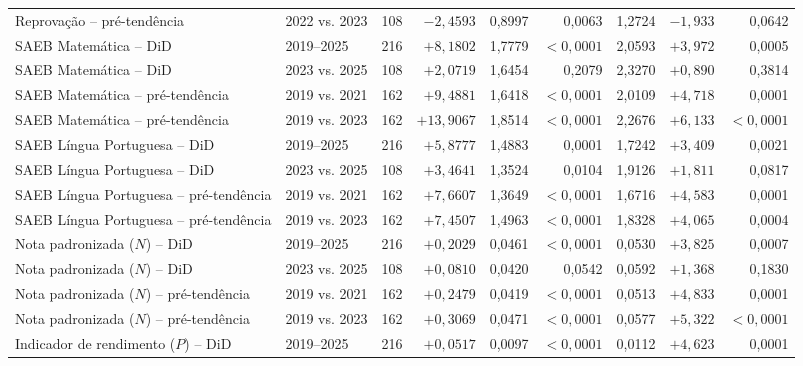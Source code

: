\begin{apendicesenv}
\begin{landscape}
{\begin{longtable}{p{5.6cm} p{2.6cm} c r r r r r r}
        Reprovação -- pré-tendência             & 2022 vs. 2023    & 108 & $-2{,}4593$  & 0,8997 & 0,0063      & 1,2724 & $-1{,}933$ & 0,0642 \\
        \addlinespace
        SAEB Matemática -- DiD                  & 2019--2025       & 216 & $+8{,}1802$  & 1,7779 & $<0{,}0001$ & 2,0593 & $+3{,}972$ & 0,0005 \\
        SAEB Matemática -- DiD                  & 2023 vs. 2025    & 108 & $+2{,}0719$  & 1,6454 & 0,2079      & 2,3270 & $+0{,}890$ & 0,3814 \\
        SAEB Matemática -- pré-tendência        & 2019 vs. 2021    & 162 & $+9{,}4881$  & 1,6418 & $<0{,}0001$ & 2,0109 & $+4{,}718$ & 0,0001 \\
        SAEB Matemática -- pré-tendência        & 2019 vs. 2023    & 162 & $+13{,}9067$ & 1,8514 & $<0{,}0001$ & 2,2676 & $+6{,}133$ & $<0{,}0001$ \\
        \addlinespace
        SAEB Língua Portuguesa -- DiD           & 2019--2025       & 216 & $+5{,}8777$  & 1,4883 & 0,0001      & 1,7242 & $+3{,}409$ & 0,0021 \\
        SAEB Língua Portuguesa -- DiD           & 2023 vs. 2025    & 108 & $+3{,}4641$  & 1,3524 & 0,0104      & 1,9126 & $+1{,}811$ & 0,0817 \\
        SAEB Língua Portuguesa -- pré-tendência & 2019 vs. 2021    & 162 & $+7{,}6607$  & 1,3649 & $<0{,}0001$ & 1,6716 & $+4{,}583$ & 0,0001 \\
        SAEB Língua Portuguesa -- pré-tendência & 2019 vs. 2023    & 162 & $+7{,}4507$  & 1,4963 & $<0{,}0001$ & 1,8328 & $+4{,}065$ & 0,0004 \\
        \addlinespace
        Nota padronizada ($N$) -- DiD           & 2019--2025       & 216 & $+0{,}2029$  & 0,0461 & $<0{,}0001$ & 0,0530 & $+3{,}825$ & 0,0007 \\
        Nota padronizada ($N$) -- DiD           & 2023 vs. 2025    & 108 & $+0{,}0810$  & 0,0420 & 0,0542      & 0,0592 & $+1{,}368$ & 0,1830 \\
        Nota padronizada ($N$) -- pré-tendência & 2019 vs. 2021    & 162 & $+0{,}2479$  & 0,0419 & $<0{,}0001$ & 0,0513 & $+4{,}833$ & 0,0001 \\
        Nota padronizada ($N$) -- pré-tendência & 2019 vs. 2023    & 162 & $+0{,}3069$  & 0,0471 & $<0{,}0001$ & 0,0577 & $+5{,}322$ & $<0{,}0001$ \\
        \addlinespace
        Indicador de rendimento ($P$) -- DiD    & 2019--2025       & 216 & $+0{,}0517$  & 0,0097 & $<0{,}0001$ & 0,0112 & $+4{,}623$ & 0,0001 \\

\end{longtable}}
\end{landscape}
\end{apendicesenv}
